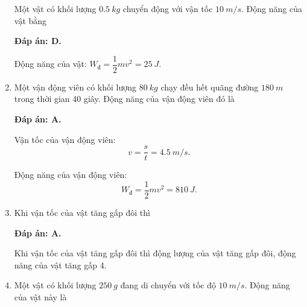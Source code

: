 \begin{enumerate}[label=\bfseries Câu \arabic*:]
	
	{
			Một vật có khối lượng $\SI{0.5}{kg}$ chuyển động với vận tốc $\SI{10}{m/s}$. Động năng của vật bằng
	}
	
	\hideall
	{	
		\textbf{Đáp án: D.}
		
		Động năng của vật: $W_\text{đ} = \dfrac{1}{2}mv^2 = \SI{25}{J}$.
	}
	\item {}
	
	
	{
		Một vận động viên có khối lượng $\SI{80}{kg}$ chạy đều hết quãng đường $\SI{180}{m}$ trong thời gian 40 giây. Động năng của vận động viên đó là
	}
	
	\hideall
	{	
		\textbf{Đáp án: A.}
		
		Vận tốc của vận động viên:
		$$v=\dfrac{s}{t} = \SI{4.5}{m/s}.$$
		
		Động năng của vận động viên:
		$$W_\text{đ} = \dfrac{1}{2} mv^2 = \SI{810}{J}.$$
	}
	\item {}
	
	
	{
		Khi vận tốc của vật tăng gấp đôi thì
	}
	
	\hideall
	{	
		\textbf{Đáp án: A.}
		
		Khi vận tốc của vật tăng gấp đôi thì động lượng của vật tăng gấp đôi, động năng của vật tăng gấp 4.
	}
	\item {}
	
	
	{
		Một vật có khối lượng $\SI{250}{g}$ đang di chuyển với tốc độ $\SI{10}{m/s}$. Động năng của vật này là
	}
	

\end{enumerate}
